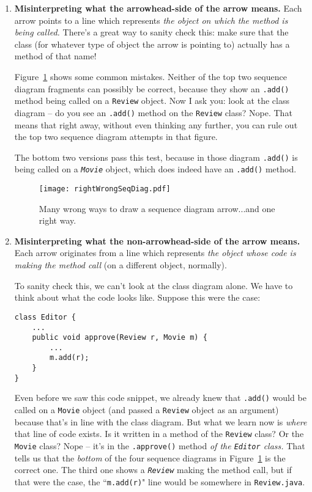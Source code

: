 \begin{enumerate}
\itemsep.1em
\item \textbf{Misinterpreting what the arrowhead-side of the arrow means.}
Each arrow points to a line which represents \textit{the object on which the
method is being called.} There's a great way to sanity check this: make sure
that the class (for whatever type of object the arrow is pointing to) actually
has a method of that name!

Figure~\ref{fig:rightWrongSeqDiag} shows some common mistakes. Neither of the
top two sequence diagram fragments can possibly be correct, because they show
an \texttt{.add()} method being called on a \texttt{Review} object. Now I ask
you: look at the class diagram -- do you see an \texttt{.add()} method on the
\texttt{Review} class? Nope. That means that right away, without even thinking
any further, you can rule out the top two sequence diagram attempts in that
figure.

The bottom two versions pass this test, because in those diagram
\texttt{.add()} is being called on a \textit{\texttt{Movie}} object, which
does indeed have an \texttt{.add()} method.

\begin{figure}
\centering
\texttt{[image: rightWrongSeqDiag.pdf]}  %
\caption{Many wrong ways to draw a sequence diagram arrow...and one right
way.}
\label{fig:rightWrongSeqDiag}
\end{figure}

\item \textbf{Misinterpreting what the non-arrowhead-side of the arrow means.}
Each arrow originates from a line which represents \textit{the object whose
code is making the method call} (on a different object, normally). 

To sanity check this, we can't look at the class diagram alone. We have to
think about what the code looks like. Suppose this were the case:

\begin{Verbatim}[fontsize=\small,samepage=true,frame=single]
class Editor {
    ...
    public void approve(Review r, Movie m) {
        ...
        m.add(r);
    }
}
\end{Verbatim}

Even before we saw this code snippet, we already knew that \texttt{.add()}
would be called on a \texttt{Movie} object (and passed a \texttt{Review}
object as an argument) because that's in line with the class diagram. But what
we learn now is \textit{where} that line of code exists. Is it written in a
method of the \texttt{Review} class? Or the \texttt{Movie} class? Nope -- it's
in the \texttt{.approve()} method \textit{of the \texttt{Editor} class.} That
tells us that the \textit{bottom} of the four sequence diagrams in
Figure~\ref{fig:rightWrongSeqDiag} is the correct one. The third one shows a
\textit{\texttt{Review}} making the method call, but if that were the case,
the ``\texttt{m.add(r)}" line would be somewhere in \texttt{Review.java}.

\end{enumerate}

